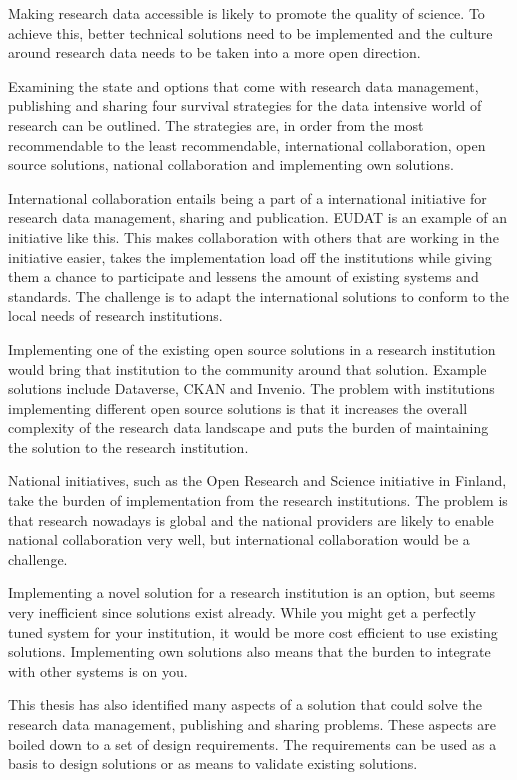Making research data accessible is likely to promote the quality of science.
To achieve this, better technical solutions need to be implemented and the
culture around research data needs to be taken into a more open direction.

Examining the state and options that come with research data management,
publishing and sharing four survival strategies for the data intensive world
of research can be outlined. The strategies are, in order from the most recommendable
to the least recommendable, international collaboration,
open source solutions, national collaboration and implementing own solutions.

International collaboration entails being a part of a international initiative
for research data management, sharing and publication. EUDAT is an example of
an initiative like this. This makes collaboration with others that are working
in the initiative easier, takes the implementation load off the institutions
while giving them a chance to participate and lessens the amount of existing
systems and standards. The challenge is to adapt the international solutions
to conform to the local needs of research institutions.

Implementing one of the existing open source solutions in a research
institution would bring that institution to the community around that solution.
Example solutions include Dataverse, CKAN and Invenio. The problem with institutions
implementing different open source solutions is that it increases the overall
complexity of the research data landscape and puts the burden of maintaining
the solution to the research institution.

National initiatives, such as the Open Research and Science initiative in Finland,
take the burden of implementation from the research institutions. The problem is that
research nowadays is global and the national providers are likely to enable national
collaboration very well, but international collaboration would be a challenge.

Implementing a novel solution for a research institution is an option, but seems
very inefficient since solutions exist already. While you might get a perfectly
tuned system for your institution, it would be more cost efficient to use existing
solutions. Implementing own solutions also means that the burden to integrate with
other systems is on you.

This thesis has also identified many aspects of a solution that could solve the
research data management, publishing and sharing problems. These aspects are
boiled down to a set of design requirements. The requirements
can be used as a basis to design solutions or as means to validate existing
solutions.

